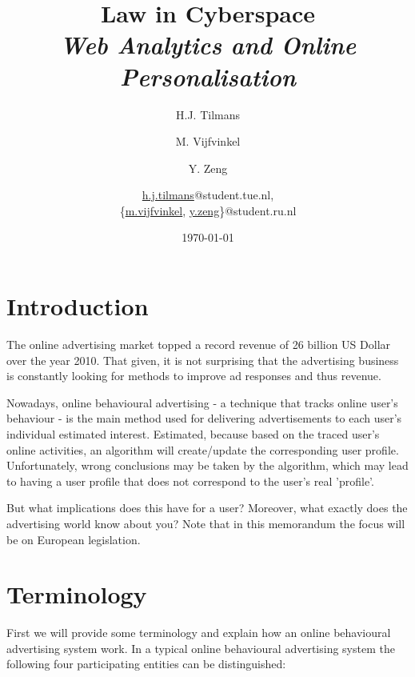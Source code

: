\documentclass[11pt]{article}
\title{\textbf{Law in Cyberspace\\ \emph{Web Analytics and Online Personalisation}}}
\author{
	H.J. Tilmans
	\and M. Vijfvinkel
	\and Y. Zeng
	\and
	\href{mailto:h.j.tilmans@student.tue.nl}{h.j.tilmans}@student.tue.nl,\\
	\{\href{mailto:m.vijfvinkel@student.ru.nl}{m.vijfvinkel},
	\href{mailto:y.zeg@student.ru.nl}{y.zeng}\}@student.ru.nl
}
\date{\today}
\newcommand{\oba}{online behavioural advertising }
\begin{document}
\maketitle


\section{Introduction}
The online advertising market topped a record revenue of 26 billion US Dollar over the year 2010. \cite{IAB2011}
That given, it is not surprising that the advertising business is constantly looking for methods to improve ad responses and thus revenue.

Nowadays, \oba - a technique that tracks online user's behaviour - is the main method used for delivering advertisements to each user's individual estimated interest. Estimated, because based on the traced user's online activities, an algorithm will create/update the corresponding user profile. Unfortunately, wrong conclusions may be taken by the algorithm, which may lead to having a user profile that does not correspond to the user's real 'profile'.

But what implications does this have for a user? Moreover, what exactly does the advertising world know about you?
Note that in this memorandum the focus will be on European legislation.

\section{Terminology}
\label{terminology}
First we will provide some terminology and explain how an \oba system work.
In a typical \oba system the following four participating entities can be distinguished:
\end{document}
